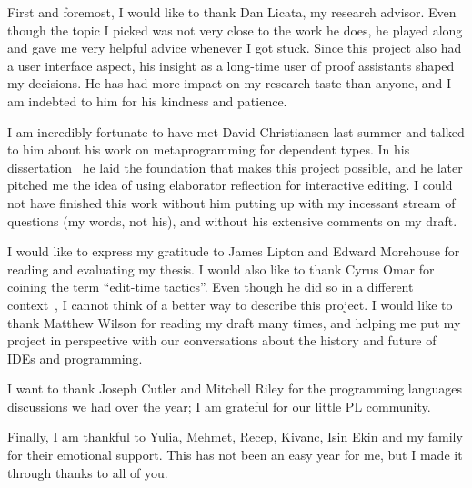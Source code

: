 \documentclass[11pt, ma]{westhesis}
\newcommand{\forceindent}{\hspace{\parindent}}
\theoremstyle{plain}
\theoremstyle{definition}
\numberwithin{section}{chapter}
\numberwithin{figure}{chapter}
\begin{document}
\begin{acknowledgements}
\forceindent First and foremost, I would like to thank Dan Licata, my research
  advisor.  Even though the topic I picked was not very close to the work he
  does, he played along and gave me very helpful advice whenever I got stuck.
  Since this project also had a user interface aspect, his insight as a
  long-time user of proof assistants shaped my decisions.  He has had more
  impact on my research taste than anyone, and I am indebted to him for his
  kindness and patience.

I am incredibly fortunate to have met David Christiansen last summer and talked
to him about his work on metaprogramming for dependent types.
In his dissertation~\cite{davidphd} he laid the foundation that makes this
project possible, and he later pitched me the idea of using elaborator
reflection for interactive editing.
I could not have finished this work without him putting up with my incessant
stream of questions (my words, not his), and without his extensive comments on my draft.

I would like to express my gratitude to James Lipton and Edward Morehouse for
reading and evaluating my thesis. I would also like to thank Cyrus Omar for
coining the term ``edit-time tactics''. Even though he did so in a different
context~\cite{hazelnut,hazelEditor}, I cannot think of a better way to describe this
project. I would like to thank Matthew Wilson for reading my draft many
times, and helping me put my project in perspective with our conversations
about the history and future of IDEs and programming.

I want to thank Joseph Cutler and Mitchell Riley for the programming languages
discussions we had over the year; I am grateful for our little PL community.

Finally, I am thankful to Yulia, Mehmet, Recep, Kivanc, Isin Ekin and
my family for their emotional support. This has not been an easy year for me,
but I made it through thanks to all of you.
\end{acknowledgements}

\frontmatter
\maketitle
\makeabstract
\makededication
\makeack

\tableofcontents

\newcommand{\nocontentsline}[3]{}
\bgroup\let\addcontentsline=\nocontentsline
\renewcommand\numberline[1]{#1.\ }
\listoffigures
\egroup

\mainmatter












\end{document}
